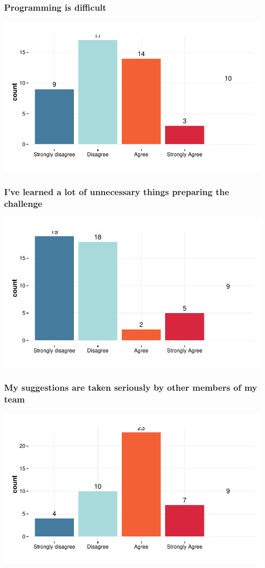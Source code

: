 \documentclass{article}
\begin{document}
\subsubsection{Programming is difficult}
\includegraphics{Raw_num/plots/-plot_hard_prog}

\subsubsection{I’ve learned a lot of unnecessary things preparing the challenge}
\includegraphics{Raw_num/plots/-plot_useless_challenge}

\subsubsection{My suggestions are taken seriously by other members of my team}
\includegraphics{Raw_num/plots/-plot_serious_input}
\end{document}
